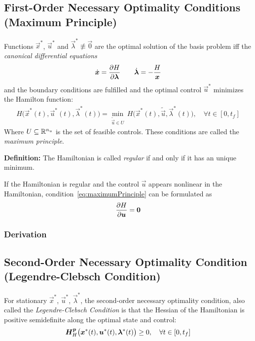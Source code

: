		\subsection{First-Order Necessary Optimality Conditions (Maximum Principle)}
			Functions \( \vec{x}^\ast \), \( \vec{u}^\ast \) and \( \vec{\lambda}^\ast \not\equiv \vec{0} \) are the optimal solution of the basis problem iff the \emph{canonical differential equations}
			\begin{align*}
				\dot{\bm{x}} = \pdv{H}{\bm{\lambda}} \qquad \dot{\bm{\lambda}} = -\frac{H}{\bm{x}}
			\end{align*}
			and the boundary conditions are fulfilled and the optimal control \(\vec{u}^\ast\) minimizes the Hamilton function:
			\begin{align}
				H\big(\vec{x}^\ast(t), \vec{u}^\ast(t), \vec{\lambda}^\ast(t)\big) = \min_{\tilde{\vec{u}} \in U} \, H\big(\vec{x}^\ast(t), \tilde{\vec{u}}, \vec{\lambda}^\ast(t)\big),\quad \forall t \in [0, t_f]  \label{eq:maximumPrinciple}
			\end{align}
			Where \( U \subseteq \mathbb{R}^{n_u} \) is the set of feasible controls. These conditions are called the \emph{maximum principle}.

			\textbf{Definition:} The Hamiltonian is called \emph{regular} if and only if it has an unique minimum.

			If the Hamiltonian is regular and the control \(\vec{u}\) appears nonlinear in the Hamiltonian, condition~\eqref{eq:maximumPrinciple} can be formulated as
			\begin{align*}
				\pdv{H}{\bm{u}} = \bm{0}
			\end{align*}

			\subsubsection{Derivation} %

		\subsection{Second-Order Necessary Optimality Condition (Legendre-Clebsch Condition)} %
			For stationary \(\vec{x}^\ast\), \(\vec{u}^\ast\), \(\vec{\lambda}^\ast\), the second-order necessary optimality condition, also called the \emph{Legendre-Clebsch Condition} is that the Hessian of the Hamiltonian is positive semidefinite along the optimal state and control:
			\begin{align*}
				\bm{H}_H^{\bm{p}}\big(\bm{x}^\ast(t), \bm{u}^\ast(t), \bm{\lambda}^\ast(t)\big) \geq 0,\quad \forall t \in [0, t_f]
			\end{align*}

